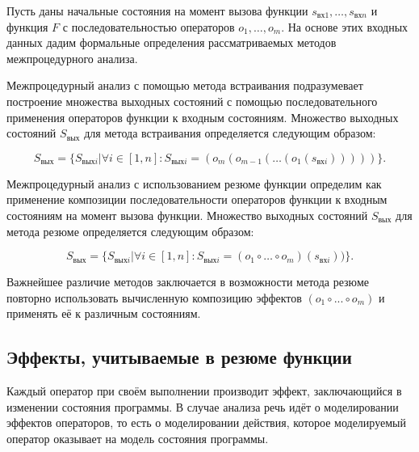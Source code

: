 Пусть даны начальные состояния на момент вызова функции $s_{\text{вх}1}, \ldots, s_{\text{вх} n}$ и функция $F$ с последовательностью операторов $o_1, \ldots, o_m$. На основе этих входных данных дадим формальные определения рассматриваемых методов межпроцедурного анализа.

Межпроцедурный анализ с помощью метода встраивания подразумевает построение множества выходных состояний с помощью последовательного применения операторов функции к входным состояниям. Множество выходных состояний $S_{вых}$ для метода встраивания определяется следующим образом:

\begin{equation}
 S_{\text{вых}} = \lbrace S_{\text{вых}i} | \forall i \in [1, n]: S_{\text{вых}i} =  (o_m(o_{m-1}(\ldots (o_1(s_{\text{вх} i}))))) \rbrace.
\end{equation}


Межпроцедурный анализ с использованием резюме функции определим как применение композиции последовательности операторов функции к входным состояниям на момент вызова функции. Множество выходных состояний $S_{\text{вых}}$ для метода резюме определяется следующим образом:

\begin{equation}
S_{\text{вых}} = \lbrace S_{\text{вых}i} | \forall i \in [1, n]: S_{\text{вых}i} =  (o_1 \circ \ldots \circ o_m)(s_{\text{вх} i})) \rbrace.
\end{equation}

Важнейшее различие методов заключается в возможности метода резюме повторно использовать вычисленную композицию эффектов $(o_1 \circ ... \circ o_m)$ и применять её к различным состояниям.

\subsection{Эффекты, учитываемые в резюме функции}

Каждый оператор при своём выполнении производит эффект, заключающийся в изменении состояния программы. В случае анализа речь идёт о моделировании эффектов операторов, то есть о моделировании действия, которое моделируемый оператор оказывает на модель состояния программы.

